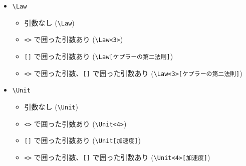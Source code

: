 \documentclass[oneside,10pt,a4paper]{jsarticle}
\begin{document}
\begin{itemize}
\begin{itemize}
          \begin{quote}
            \Theory[特殊相対性理論]
          \end{quote}
        \item \verb|<>| で囲った引数、\verb|[]| で囲った引数あり (\verb|\Theory<2>[特殊相対性理論]|)
          \begin{quote}
          \end{quote}
      \end{itemize}
    \newpage
    \item \verb|\Law|
      \begin{itemize}
        \item 引数なし (\verb|\Law|)
          \begin{quote}
            \Law
          \end{quote}
        \item \verb|<>| で囲った引数あり (\verb|\Law<3>|)
          \begin{quote}
          \end{quote}
        \item \verb|[]| で囲った引数あり (\verb|\Law[ケプラーの第二法則]|)
          \begin{quote}
            \Law[ケプラーの第二法則]
          \end{quote}
        \item \verb|<>| で囲った引数、\verb|[]| で囲った引数あり (\verb|\Law<3>[ケプラーの第二法則]|)
          \begin{quote}
          \end{quote}
      \end{itemize}
    \item \verb|\Unit|
      \begin{itemize}
        \item 引数なし (\verb|\Unit|)
          \begin{quote}
            \Unit
          \end{quote}
        \item \verb|<>| で囲った引数あり (\verb|\Unit<4>|)
          \begin{quote}
          \end{quote}
        \item \verb|[]| で囲った引数あり (\verb|\Unit[加速度]|)
          \begin{quote}
            \Unit[加速度]
          \end{quote}
        \item \verb|<>| で囲った引数、\verb|[]| で囲った引数あり (\verb|\Unit<4>[加速度]|)
          \begin{quote}
          \end{quote}
      \end{itemize}
  \end{itemize}
\end{document}
